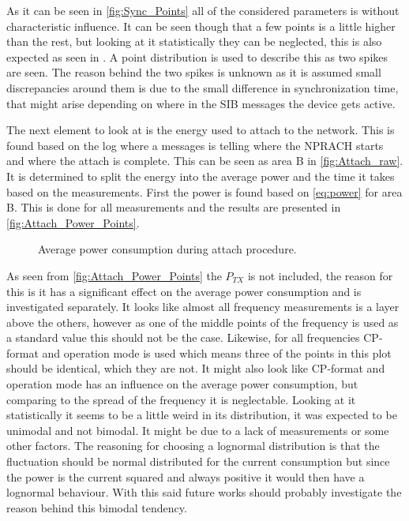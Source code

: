 As it can be seen in \autoref{fig:Sync_Points} all of the considered parameters is without characteristic influence. It can be seen though that a few points is a little higher than the rest, but looking at it statistically they can be neglected, this is also expected as seen in . A point distribution is used to describe this as two spikes are seen. The reason behind the two spikes is unknown as it is assumed small discrepancies around them is due to the small difference in synchronization time, that might arise depending on where in the \gls{SIB} messages the device gets active. 

The next element to look at is the energy used to attach to the network. This is found based on the log where a messages is telling where the NPRACH starts and where the attach is complete. This can be seen as area B in \autoref{fig:Attach_raw}. It is determined to split the energy into the average power and the time it takes based on the measurements. First the power is found based on \autoref{eq:power} for area B. 
This is done for all measurements and the results are presented in \autoref{fig:Attach_Power_Points}.

\begin{figure}[H]
\centering
\begin{minipage}{0.48\textwidth}
\resizebox{\textwidth}{!}{
}
\end{minipage}
\hfill
\begin{minipage}{0.48\textwidth}
\resizebox{\textwidth}{!}{
}
\end{minipage}
\caption{Average power consumption during attach procedure.}
\label{fig:Attach_Power_Points}
\end{figure}

As seen from \autoref{fig:Attach_Power_Points} the $P_{TX}$ is not included, the reason for this is it has a significant effect on the average power consumption and is investigated separately. It looks like almost all frequency measurements is a layer above the others, however as one of the middle points of the frequency is used as a standard value this should not be the case. Likewise, for all frequencies CP-format and operation mode is used which means three of the points in this plot should be identical, which they are not. It might also look like CP-format and operation mode has an influence on the average power consumption, but comparing to the spread of the frequency it is neglectable. Looking at it statistically it seems to be a little weird in its distribution, it was expected to be unimodal and not bimodal. It might be due to a lack of measurements or some other factors. The reasoning for choosing a lognormal distribution is that the fluctuation should be normal distributed for the current consumption but since the power is the current squared and always positive it would then have a lognormal behaviour. With this said future works should probably investigate the reason behind this bimodal tendency. 

